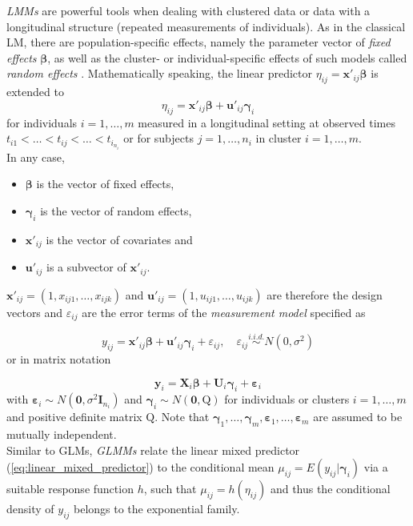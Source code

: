 \textit{\acp{LMM}} are powerful tools when dealing with clustered data or data with a longitudinal structure (repeated measurements of individuals).
As in the classical \ac{LM}, there are population-specific effects, namely the parameter vector of \textit{fixed effects} $\boldsymbol{\beta}$, as well as the cluster- or individual-specific effects of such models called \textit{random effects} \citep{fahrmeir2003regression}. 
Mathematically speaking, the linear predictor $\eta_{ij}= \mathbf{x}'_{ij} \mathbf{\beta} $ is extended to
\begin{equation}
\eta_{ij} = \bm{{x'}}_{ij} \bm{\beta} + \bm{u'}_{ij}\bm{\gamma}_i  
\label{eq:linear_mixed_predictor}
\end{equation}
for individuals $i=1, \ldots, m$ measured in a longitudinal setting at observed times $t_{i1} < \ldots < t_{ij} < \ldots < t_{i_{n_i}}$
or for subjects $j=1, \ldots, n_i$ in cluster $i=1, \ldots, m$. \\
In any case,
\begin{itemize}
\item $\bm{\beta}$ is the vector of fixed effects,
\item $\bm{\gamma}_i$ is the vector of random effects,
\item $\bm{x'}_{ij}$ is the vector of covariates and
\item $\bm{u'}_{ij}$ is a subvector of $\bm{x'}_{ij}$.
\end{itemize}


$\bm{x'}_{ij} = (1, x_{ij1}, \ldots, x_{ijk}) $ and $ \bm{u'}_{ij} = (1, u_{ij1}, \ldots, u_{ijk}) $ are therefore the design vectors and $\varepsilon_{ij}$ are the error terms of the \textit{measurement model}%
specified as

\begin{equation}
y_{ij} =  \bm{x'}_{ij} \bm{\beta} + \bm{u'}_{ij} \bm{\gamma}_i + \varepsilon_{ij}, \quad \varepsilon_{i j} \overset{i.i.d.} \sim N\left(0, \sigma^{2}\right) 
\end{equation}
or in matrix notation

\begin{equation}
\bm{y}_{i}=\bm{X}_{i} \bm{\beta} + \bm{U}_{i} \bm{\gamma}_{i} + \bm{\varepsilon}_{i}
\end{equation}
with $ \bm{\varepsilon}_{i} \sim N (\bm{0}, \sigma^2 {\bm{I}}_{n_{i}})$ and $ \bm{\gamma}_{i} \sim N (\bm{0}, \bm{\mathrm{Q}})$ for individuals or clusters $ i=1, \ldots, m $ and positive definite matrix $\bm{\mathrm{Q}}$. Note that $\bm{\gamma}_1, \ldots, \bm{\gamma}_m, \bm{\varepsilon}_1, \ldots, \bm{\varepsilon}_m$ are assumed to be mutually independent. \\

Similar to \acp{GLM}, \textit{\acp{GLMM}} relate the linear mixed predictor (\autoref{eq:linear_mixed_predictor}) to the conditional mean 
$ \mu_{ij} = E(y_{ij} | \bm{\gamma}_{i}) $
via a suitable response function $h$, such that
$ \mu_{ij} = h(\eta_{ij}) $ and thus the conditional density of $y_{ij}$ belongs to the exponential family.